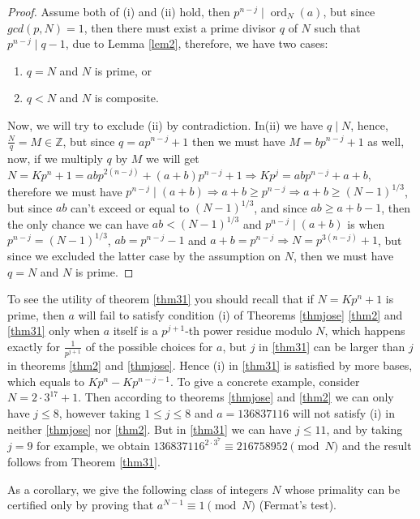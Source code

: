 \documentclass{amsart}
\numberwithin{equation}{section}
\DeclareMathOperator{\ord}{ord}
\begin{document}
\begin{proof}
	Assume both of (i) and (ii) hold, then $p^{n-j} \mid \ord_N(a)$, but since $gcd(p,N)=1$, then there must exist a prime divisor $q$ of $N$ such that $p^{n-j} \mid q-1$, due to Lemma \ref{lem2}, therefore, we have two cases:
	\begin{enumerate}
		\item[(i)] $q=N$ and $N$ is prime, or
		\item[(ii)] $q < N$ and $N$ is composite.
	\end{enumerate}
	Now, we will try to exclude (ii) by contradiction. In(ii) we have $q \mid N$, hence, $\frac{N}{q}=M \in \mathbb{Z}$, but since $q=ap^{n-j}+1$ then we must have $M=bp^{n-j}+1$ as well, now, if we multiply $q$ by $M$ we will get $N=Kp^n+1=abp^{2(n-j)}+(a+b)p^{n-j}+1 \Longrightarrow Kp^{j}=abp^{n-j}+a+b$, therefore we must have $p^{n-j} \mid (a+b) \Longrightarrow a+b \ge p^{n-j} \Longrightarrow a+b \ge (N-1)^{1/3}$, but since $ab$ can't exceed or equal to $(N-1)^{1/3}$, and since $ab \ge a+b-1$, then the only chance we can have $ab < (N-1)^{1/3}$ and $p^{n-j} \mid (a+b)$ is when $p^{n-j}=(N-1)^{1/3}$, $ab=p^{n-j}-1$ and $a+b=p^{n-j} \Longrightarrow N=p^{3(n-j)}+1$, but since we excluded the latter case by the assumption on $N$, then we must have $q=N$ and $N$ is prime.
	
\end{proof}
To see the utility of theorem \ref{thm31} you should recall that if $N=Kp^n+1$ is prime, then $a$ will fail to satisfy condition (i) of Theorems \ref{thmjose} \ref{thm2} and \ref{thm31} only when $a$ itself is a $p^{j+1}$-th power residue modulo $N$, which happens exactly for $\frac{1}{p^{j+1}}$ of the possible choices for $a$, but $j$ in \ref{thm31} can be larger than $j$ in theorems \ref{thm2} and \ref{thmjose}. Hence (i) in \ref{thm31} is satisfied by more bases, which equals to $Kp^n-Kp^{n-j-1}$. To give a concrete example, consider $N=2\cdot 3^{17}+1$. Then according to theorems \ref{thmjose} and \ref{thm2} we can only have $j \leq 8$, however taking $1 \le j \le 8$ and $a=136837116$ will not satisfy (i) in neither \ref{thmjose} nor \ref{thm2}. But in \ref{thm31} we can have $j \leq 11$, and by taking $j=9$ for example, we obtain $136837116^{2\cdot 3^{7}}\equiv 216758952 \pmod N$ and the result follows from Theorem \ref{thm31}.

As a corollary, we give the following class of integers $N$ whose primality can be certified only by proving that $a^{N-1} \equiv 1 \pmod N$ (Fermat's test).
\end{document}
